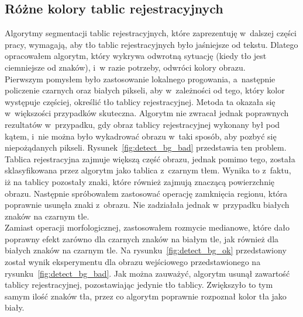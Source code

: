 \subsection{Różne kolory tablic rejestracyjnych}\label{ssec:different_backgrounds}
Algorytmy segmentacji tablic rejestracyjnych, które zaprezentuję w~dalszej części pracy, wymagają, aby tło tablic rejestracyjnych było jaśniejsze od tekstu. Dlatego opracowałem algorytm, który wykrywa odwrotną sytuację (kiedy tło jest ciemniejsze od znaków), i~w razie potrzeby, odwróci kolory obrazu.\\
Pierwszym pomysłem było zastosowanie lokalnego progowania, a~następnie policzenie czarnych oraz białych pikseli, aby w~zależności od tego, który kolor występuje częściej, określić tło tablicy rejestracyjnej. Metoda ta okazała się w~większości przypadków skuteczna. Algorytm nie zwracał jednak poprawnych rezultatów w~przypadku, gdy obraz tablicy rejestracyjnej wykonany był pod kątem, i~nie można było wykadrować obrazu w~taki sposób, aby pozbyć się niepożądanych pikseli. Rysunek~\ref{fig:detect_bg_bad} przedstawia ten problem. Tablica rejestracyjna zajmuje większą część obrazu, jednak pomimo tego, została sklasyfikowana przez algorytm jako tablica z~czarnym tłem. Wynika to z~faktu, iż na tablicy pozostały znaki, które również zajmują znaczącą powierzchnię obrazu. Następnie spróbowałem zastosować operację zamknięcia regionu, która poprawnie usunęła znaki z~obrazu. Nie zadziałała jednak w~przypadku białych znaków na czarnym tle. \\
Zamiast operacji morfologicznej, zastosowałem rozmycie medianowe, które dało poprawny efekt zarówno dla czarnych znaków na białym tle, jak również dla białych znaków na czarnym tle. Na rysunku~\ref{fig:detect_bg_ok} przedstawiony został wynik eksperymentu dla obrazu wejściowego przedstawionego na rysunku~\ref{fig:detect_bg_bad}. Jak można zauważyć, algorytm usunął zawartość tablicy rejestracyjnej, pozostawiając jedynie tło tablicy. Zwiększyło to tym samym ilość znaków tła, przez co algorytm poprawnie rozpoznał kolor tła jako biały.

